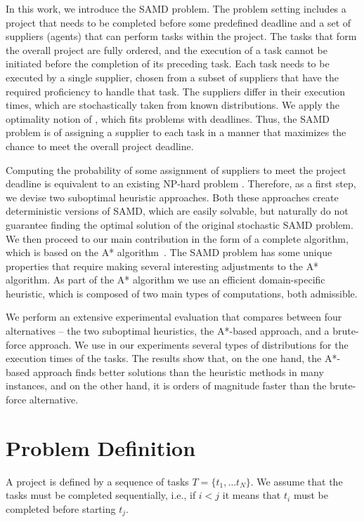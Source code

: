 \documentclass[letterpaper]{article} %
\newcommand{\samd}{\ac{SAMD}\xspace}
\newcommand{\astar}{\textsc{A*}\xspace}
\begin{document}
In this work, we introduce the \samd problem.
The problem setting includes a project that needs to be completed before some predefined deadline and a set of suppliers (agents) that can perform tasks within the project. The tasks that form the overall project are fully ordered, and the execution of a task cannot be initiated before the completion of its preceding task.
Each task needs to be executed by a single supplier, chosen from a subset of suppliers that have the required proficiency to handle that task. The suppliers differ in their execution times, which are stochastically taken from known distributions. 
We apply the optimality notion of \citeauthor{frank1969shortest}, which fits problems with deadlines.
Thus, the \samd problem is of assigning a supplier to each task in a manner that maximizes the chance to meet the overall project deadline.

Computing the probability of some assignment of suppliers to meet the project deadline is equivalent to an existing NP-hard problem \cite{cohen2015estimating}. Therefore, as a first step, we devise two suboptimal heuristic approaches. Both these approaches create deterministic versions of \samd, which are easily solvable, but naturally do not guarantee finding the optimal solution of the original stochastic \samd problem. We then proceed to our main contribution in the form of a complete algorithm, which is based on the \astar algorithm~\cite{hart1968formal}. The \samd problem has some unique properties that require making several interesting adjustments to the \astar algorithm. As part of the \astar algorithm we use an efficient domain-specific heuristic, which is composed of two main types of computations, both admissible. 

We perform an extensive experimental evaluation that compares between four alternatives -- the two suboptimal heuristics, the \astar-based approach, and a brute-force approach.
We use in our experiments several types of distributions for the execution times of the tasks. The results show that, on the one hand, the \astar-based approach finds better solutions than the heuristic methods in many instances, and on the other hand, it is orders of magnitude faster than the brute-force alternative.

\section{Problem Definition}
\label{sec:def}

A project is defined by a sequence of tasks $T=\{t_1,\ldots t_N\}$. We assume that the tasks must be completed sequentially, i.e., if $i<j$ it means that $t_i$ must be completed before starting $t_j$. 
\end{document}
